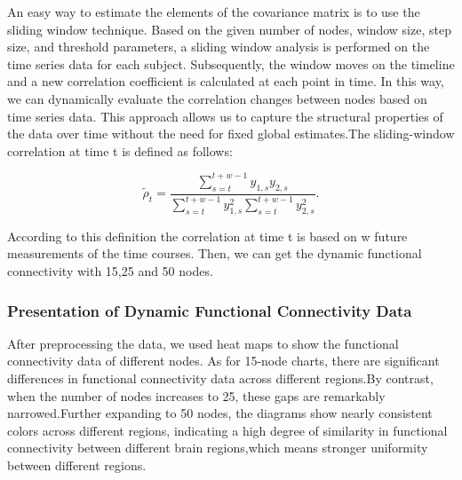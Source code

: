\documentclass[11pt]{article}
\begin{document}
An easy way to estimate the elements of the covariance matrix is to use the sliding window technique. Based on the given number of nodes, window size, step size, and threshold parameters, a sliding window analysis is performed on the time series data for each subject. Subsequently, the window moves on the timeline and a new correlation coefficient is calculated at each point in time. In this way, we can dynamically evaluate the correlation changes between nodes based on time series data. This approach allows us to capture the structural properties of the data over time without the need for fixed global estimates.The sliding-window correlation at time t is defined as follows:

$$
    \tilde\rho_t = \frac{\sum_{s=t}^{t+w-1} y_{1, s} y_{2, s}}{\sum_{s=t}^{t+w-1} y_{1, s}^2 \sum_{s=t}^{t+w-1} y_{2, s}^2}.
$$

According to this definition the correlation at time t is based on w future measurements of the time courses. Then, we can get the dynamic functional connectivity with 15,25 and 50 nodes.

\subsubsection{Presentation of Dynamic Functional Connectivity Data}

After preprocessing the data, we used heat maps to show the functional connectivity data of different nodes. As for 15-node charts, there are significant differences in functional connectivity data across different regions.By contrast, when the number of nodes increases to 25, these gaps are remarkably narrowed.Further expanding to 50 nodes, the diagrams show nearly consistent colors across different regions, indicating a high degree of similarity in functional connectivity between different brain regions,which means stronger uniformity between different regions.
\end{document}
